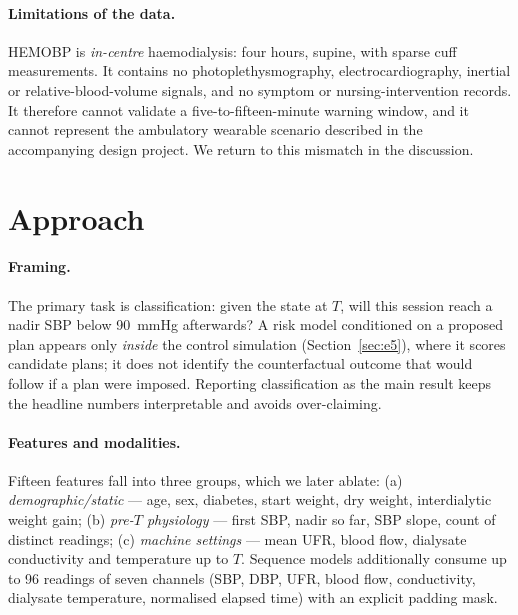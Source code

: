 \documentclass{article}
\begin{document}
\paragraph{Limitations of the data.} HEMOBP is \emph{in-centre} haemodialysis: four hours, supine, with sparse cuff measurements. It contains no photoplethysmography, electrocardiography, inertial or relative-blood-volume signals, and no symptom or nursing-intervention records. It therefore cannot validate a five-to-fifteen-minute warning window, and it cannot represent the ambulatory wearable scenario described in the accompanying design project. We return to this mismatch in the discussion.

\section{Approach}

\paragraph{Framing.} The primary task is classification: given the state at $T$, will this session reach a nadir SBP below 90~mmHg afterwards? A risk model conditioned on a proposed plan appears only \emph{inside} the control simulation (Section~\ref{sec:e5}),
where it scores candidate plans; it does not identify the counterfactual outcome that would follow if a plan were imposed. Reporting classification as the main result keeps the headline numbers interpretable and avoids over-claiming.

\paragraph{Features and modalities.} Fifteen features fall into three groups, which we later ablate: (a) \emph{demographic/static} --- age, sex, diabetes, start weight, dry weight, interdialytic weight gain; (b) \emph{pre-$T$ physiology} --- first SBP, nadir so far, SBP slope, count of distinct readings; (c) \emph{machine settings} --- mean UFR, blood flow, dialysate conductivity and temperature up to $T$. Sequence models additionally consume up to 96 readings of seven channels (SBP, DBP, UFR, blood flow, conductivity, dialysate temperature, normalised elapsed time) with an explicit padding mask.
\end{document}
